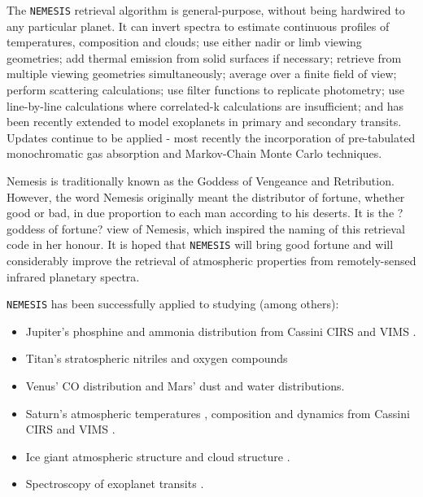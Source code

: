 \documentclass[final,5p,times,twocolumn,authoryear]{elsarticle}
\begin{document}
The \verb#NEMESIS# retrieval algorithm is general-purpose, without being hardwired to any particular planet.  It can invert spectra to estimate continuous profiles of temperatures, composition and clouds; use either nadir or limb viewing geometries; add thermal emission from solid surfaces if necessary; retrieve from multiple viewing geometries simultaneously; average over a finite field of view; perform scattering calculations; use filter functions to replicate photometry; use line-by-line calculations where correlated-k calculations are insufficient; and has been recently extended to model exoplanets in primary and secondary transits.  Updates continue to be applied - most recently the incorporation of pre-tabulated monochromatic gas absorption and Markov-Chain Monte Carlo techniques.

Nemesis is traditionally known as the Goddess of Vengeance and Retribution.  However, the word Nemesis originally meant the distributor of fortune, whether good or bad, in due proportion to each man according to his deserts.  It is the ?goddess of fortune? view of Nemesis, which inspired the naming of this retrieval code in her honour. It is hoped that \verb#NEMESIS# will bring good fortune and will considerably improve the retrieval of atmospheric properties from remotely-sensed infrared planetary spectra.

\verb#NEMESIS# has been successfully applied to studying (among others):

\begin{itemize}
\item Jupiter's phosphine and ammonia distribution from Cassini CIRS \citep{04irwin, 09fletcher_ph3} and VIMS \citep{15giles}.
\item Titan's stratospheric nitriles \citep{05teanby} and oxygen compounds \citep{07dekok}
\item Venus' CO distribution \citep{07tsang_phd} and Mars' dust and water distributions.  
\item Saturn's atmospheric temperatures \citep{07fletcher_temp, 15fletcher}, composition \citep{09fletcher_ch4} and dynamics \citep{08fletcher_poles, 11fletcher_storm} from Cassini CIRS \citep{07fletcher_phd} and VIMS \citep{11fletcher_vims}.
\item Ice giant atmospheric structure \citep{14fletcher_nep} and cloud structure \citep[e.g.,][]{17irwin}.
\item Spectroscopy of exoplanet transits \citep{12lee, 14barstow}.
\end{itemize}
\end{document}
